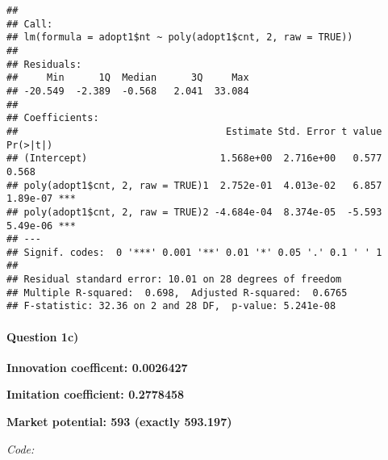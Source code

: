 \documentclass[]{article}
\newenvironment{Shaded}{\begin{snugshade}}{\end{snugshade}}
\newcommand{\CommentTok}[1]{\textcolor[rgb]{0.56,0.35,0.01}{\textit{#1}}}
\newcommand{\DecValTok}[1]{\textcolor[rgb]{0.00,0.00,0.81}{#1}}
\newcommand{\KeywordTok}[1]{\textcolor[rgb]{0.13,0.29,0.53}{\textbf{#1}}}
\newcommand{\NormalTok}[1]{#1}
\newcommand{\OperatorTok}[1]{\textcolor[rgb]{0.81,0.36,0.00}{\textbf{#1}}}
\newcommand{\StringTok}[1]{\textcolor[rgb]{0.31,0.60,0.02}{#1}}
\let\oldparagraph\paragraph
\renewcommand{\paragraph}[1]{\oldparagraph{#1}\mbox{}}
\begin{document}
\begin{verbatim}
## 
## Call:
## lm(formula = adopt1$nt ~ poly(adopt1$cnt, 2, raw = TRUE))
## 
## Residuals:
##     Min      1Q  Median      3Q     Max 
## -20.549  -2.389  -0.568   2.041  33.084 
## 
## Coefficients:
##                                    Estimate Std. Error t value Pr(>|t|)    
## (Intercept)                       1.568e+00  2.716e+00   0.577    0.568    
## poly(adopt1$cnt, 2, raw = TRUE)1  2.752e-01  4.013e-02   6.857 1.89e-07 ***
## poly(adopt1$cnt, 2, raw = TRUE)2 -4.684e-04  8.374e-05  -5.593 5.49e-06 ***
## ---
## Signif. codes:  0 '***' 0.001 '**' 0.01 '*' 0.05 '.' 0.1 ' ' 1
## 
## Residual standard error: 10.01 on 28 degrees of freedom
## Multiple R-squared:  0.698,  Adjusted R-squared:  0.6765 
## F-statistic: 32.36 on 2 and 28 DF,  p-value: 5.241e-08
\end{verbatim}

\hypertarget{question-1c}{%
\paragraph{Question 1c)}\label{question-1c}}

\textbf{Innovation coefficent: 0.0026427}

\textbf{Imitation coefficient: 0.2778458}

\textbf{Market potential: 593 (exactly 593.197)}

\emph{Code:}

\begin{Shaded}
\end{Shaded}
\end{document}
